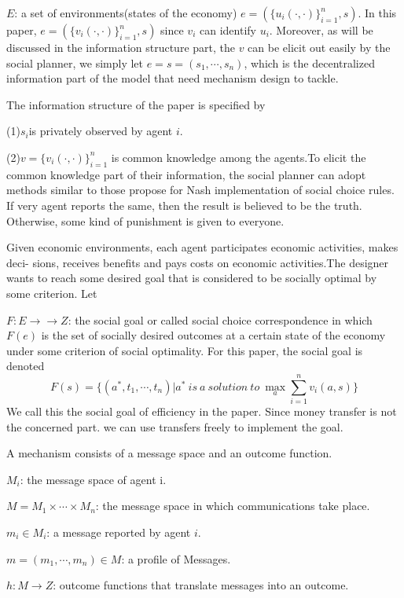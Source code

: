 $E$: a set of  environments(states of the economy) $e=(\{u_i(\cdot, \cdot)\}_{i=1}^n,s)$. In this paper, 
$e=(\{v_i(\cdot, \cdot)\}_{i=1}^n,s)$ since $v_i$ can identify $u_i$. Moreover,
as will be discussed in the information structure part, the $v$ can be elicit out easily by the social
planner, we simply let $e=s=(s_1,\cdots,s_n)$, which is the decentralized information part of the model that need 
mechanism design to tackle.

The information structure of the paper is specified by

(1)$s_i$is privately observed by agent $i$.

(2)$v=\{v_i(\cdot, \cdot)\}_{i=1}^n$ is common knowledge among the agents.To elicit the common
knowledge part of their information, the social planner can adopt methods similar to those \parencite{Repullo90} propose for Nash
implementation of social choice rules. If very agent reports the same, then the result is believed to be the truth. Otherwise,
some kind of punishment is given to everyone.  

Given economic environments, each agent participates economic activities, makes deci-
sions, receives benefits and pays costs on economic activities.The designer wants to reach
some desired goal that is considered to be socially optimal by some criterion. Let

$F:E\rightarrow \rightarrow Z$: the social goal or called social choice correspondence in which
$F(e)$ is the set of socially desired outcomes at a certain state of the economy under some
criterion of social optimality. For this paper, the social goal is denoted
$$F(s)=\{(a^*,t_1,\cdots,t_n)|a^*\ is\ a \ solution\ to \ \max_a \sum_{i=1}^n v_i(a,s)\}$$
We call this the social goal of efficiency in the paper. Since money transfer is not the concerned part.  we can use 
transfers freely to implement the goal.




 

A mechanism consists of a message space and an outcome function. 

$M_i$: the message space of agent i. 

$M=M_1\times \cdots\times M_n$: the message space in which communications take place.

$m_i \in M_i$: a message reported by agent $i$.

$m=(m_1, \cdots,m_n)\in M$: a profile of Messages.

$h:M\rightarrow Z$: outcome functions that translate messages into an outcome.

